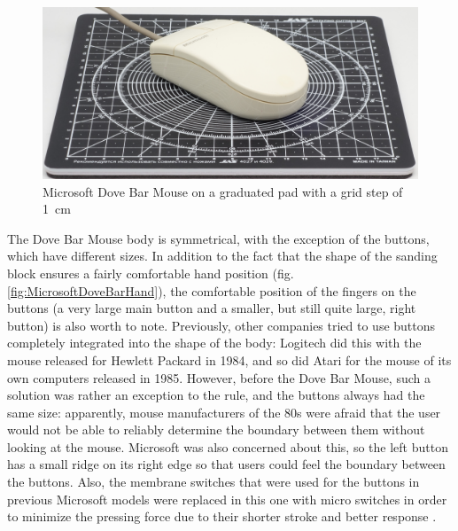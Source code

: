 \documentclass[11pt, a4paper]{article}
\begin{document}
\begin{figure}[h]
    \centering
    \includegraphics[scale=0.5]{1987_microsoft_dove_bar_mouse/size.jpg}
    \caption{Microsoft Dove Bar Mouse on a graduated pad with a grid step of 1~cm}
    \label{fig:MicrosoftDoveBarSize}
\end{figure}

The Dove Bar Mouse body is symmetrical, with the exception of the buttons, which have different sizes. In addition to the fact that the shape of the sanding block ensures a fairly comfortable hand position (fig. \ref{fig:MicrosoftDoveBarHand}), the comfortable position of the fingers on the buttons  (a very large main button and a smaller, but still quite large, right button) is also worth to note. Previously, other companies tried to use buttons completely integrated into the shape of the body: Logitech did this with the mouse released for Hewlett Packard in 1984, and so did Atari for the mouse of its own computers released in 1985. However, before the Dove Bar Mouse, such a solution was rather an exception to the rule, and the buttons always had the same size: apparently, mouse manufacturers of the 80s were afraid that the user would not be able to reliably determine the boundary between them without looking at the mouse. Microsoft was also concerned about this, so the left button has a small ridge on its right edge so that users could feel the boundary between the buttons. Also, the membrane switches that were used for the buttons in previous Microsoft models were replaced in this one with micro switches in order to minimize the pressing force due to their shorter stroke and better response \cite{doveBarDesign2, doveBarMousePcMag3}.
\end{document}
